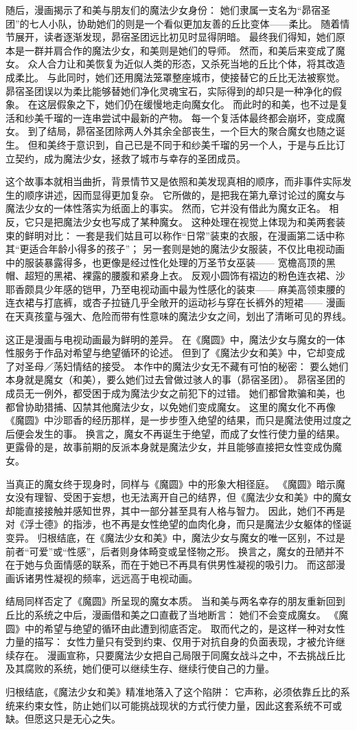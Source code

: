 随后，漫画揭示了和美与朋友们的魔法少女身份：
她们隶属一支名为“昴宿圣团”的七人小队，协助她们的则是一个看似更加友善的丘比变体——柔比。
随着情节展开，读者逐渐发现，昴宿圣团远比初见时显得阴暗。
最终我们得知，她们原本是一群并肩合作的魔法少女，和美则是她们的导师。
然而，和美后来变成了魔女。
众人合力让和美恢复为近似人类的形态，又杀死当地的丘比个体，将其改造成柔比。
与此同时，她们还用魔法笼罩整座城市，使接替它的丘比无法被察觉。
昴宿圣团误以为柔比能够替她们净化灵魂宝石，实际得到的却只是一种净化的假象。
在这层假象之下，她们仍在缓慢地走向魔女化。
而此时的和美，也不过是复活和纱美千瑠的一连串尝试中最新的产物。
每一个复活体最终都会崩坏，变成魔女。
到了结局，昴宿圣团除两人外其余全部丧生，一个巨大的聚合魔女也随之诞生。
但和美终于意识到，自己已是不同于和纱美千瑠的另一个人，于是与丘比订立契约，成为魔法少女，拯救了城市与幸存的圣团成员。

这个故事本就相当曲折，背景情节又是依照和美发现真相的顺序，而非事件实际发生的顺序讲述，因而显得更加复杂。
它所做的，是把我在第九章讨论过的魔女与魔法少女的一体性落实为纸面上的事实。
然而，它并没有借此为魔女正名。
相反，它只是把魔法少女也写成了某种魔女。
这种处理在视觉上体现为和美两套装束的鲜明对比：
一套是我们姑且可以称作“日常”装束的衣服，在漫画第二话中称其“更适合年龄小得多的孩子”；
另一套则是她的魔法少女服装，不仅比电视动画中的服装暴露得多，也更像是经过性化处理的万圣节女巫装——
宽檐高顶的黑帽、超短的黑裙、裸露的腰腹和紧身上衣。
反观小圆饰有褶边的粉色连衣裙、沙耶香颇具少年感的铠甲，乃至电视动画中最为性感化的装束——
麻美高领束腰的连衣裙与打底裤，或杏子拉链几乎全敞开的运动衫与穿在长裤外的短裙——
漫画在天真孩童与强大、危险而带有性意味的魔法少女之间，划出了清晰可见的界线。

这正是漫画与电视动画最为鲜明的差异。
在《魔圆》中，魔法少女与魔女的一体性服务于作品对希望与绝望循环的论述。
但到了《魔法少女和美》中，它却变成了对圣母／荡妇情结的接受。
本作中的魔法少女无不藏有可怕的秘密：
要么她们本身就是魔女（和美），要么她们过去曾做过骇人的事（昴宿圣团）。
昴宿圣团的成员无一例外，都受困于成为魔法少女之前犯下的过错。
她们都曾欺骗和美，也都曾协助猎捕、囚禁其他魔法少女，以免她们变成魔女。
这里的魔女化不再像《魔圆》中沙耶香的经历那样，是一步步堕入绝望的结果，而只是魔法使用过度之后便会发生的事。
换言之，魔女不再诞生于绝望，而成了女性行使力量的结果。
更露骨的是，故事前期的反派本身就是魔法少女，并且能够直接把女性变成伪魔女。

当真正的魔女终于现身时，同样与《魔圆》中的形象大相径庭。
《魔圆》暗示魔女没有理智、受困于妄想，也无法离开自己的结界，但《魔法少女和美》中的魔女却能直接接触并感知世界，其中一部分甚至具有人格与智力。
因此，她们不再是对《浮士德》的指涉，也不再是女性绝望的血肉化身，而只是魔法少女躯体的怪诞变异。
归根结底，在《魔法少女和美》中，魔法少女与魔女的唯一区别，不过是前者“可爱”或“性感”，后者则身体畸变或呈怪物之形。
换言之，魔女的丑陋并不在于她与负面情感的联系，而在于她已不再具有供男性凝视的吸引力。
而这部漫画诉诸男性凝视的频率，远远高于电视动画。

结局同样否定了《魔圆》所呈现的魔女本质。
当和美与两名幸存的朋友重新回到丘比的系统之中后，漫画借和美之口直截了当地断言：
她们不会变成魔女。
《魔圆》中的希望与绝望的循环由此遭到彻底否定。
取而代之的，是这样一种对女性力量的描写：
女性力量只有受到约束、仅用于对抗自身的负面表现，才被允许继续存在。
漫画宣称，只要魔法少女把自己局限于同魔女战斗之中，不去挑战丘比及其腐败的系统，她们便可以继续生存、继续行使自己的力量。

归根结底，《魔法少女和美》精准地落入了这个陷阱：
它声称，必须依靠丘比的系统来约束女性，防止她们以可能挑战现状的方式行使力量，因此这套系统不可或缺。但愿这只是无心之失。
